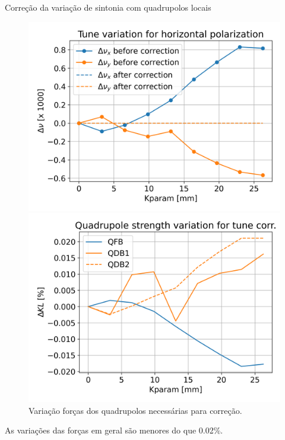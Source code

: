 \documentclass[1610]{beamer}					  %
\begin{document}
\begin{frame}{Correção da variação de sintonia com quadrupolos locais}
    \begin{figure}[ht]
        \begin{minipage}[b]{0.45\linewidth}
            \centering
            \includegraphics[width=\textwidth]{2024-04-19/figures/tune_corr_model.png}
            \caption{Correção das variações de sintonia usando modelo fitado.}
            \label{fig:a}
        \end{minipage}
        \hspace{0.5cm}
        \begin{minipage}[b]{0.45\linewidth}
            \centering
            \includegraphics[width=\textwidth]{2024-04-19/figures/Quad_stg.png}
            \caption{Variação forças dos quadrupolos necessárias para correção.}
            \label{fig:b}
        \end{minipage}
    \end{figure}
As variações das forças em geral são menores do que 0.02\%.
\end{frame}
\end{document}
